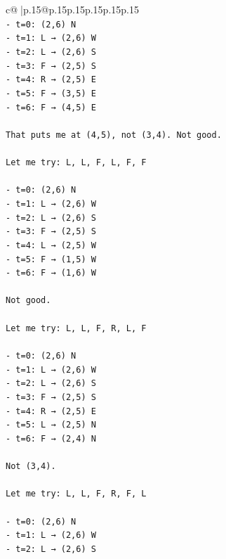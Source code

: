 \documentclass{article}
\begin{document}
{\begin{supertabular}{c@{$\;$}|p{.15\linewidth}@{}p{.15\linewidth}p{.15\linewidth}p{.15\linewidth}p{.15\linewidth}p{.15\linewidth}}
{{{\\ 
\texttt{{-} t=0: (2,6) N} \\
\texttt{{-} t=1: L → (2,6) W} \\
\texttt{{-} t=2: L → (2,6) S} \\
\texttt{{-} t=3: F → (2,5) S} \\
\texttt{{-} t=4: R → (2,5) E} \\
\texttt{{-} t=5: F → (3,5) E} \\
\texttt{{-} t=6: F → (4,5) E} \\
\\ 
\texttt{That puts me at (4,5), not (3,4). Not good.} \\
\\ 
\texttt{Let me try: L, L, F, L, F, F} \\
\\ 
\texttt{{-} t=0: (2,6) N} \\
\texttt{{-} t=1: L → (2,6) W} \\
\texttt{{-} t=2: L → (2,6) S} \\
\texttt{{-} t=3: F → (2,5) S} \\
\texttt{{-} t=4: L → (2,5) W} \\
\texttt{{-} t=5: F → (1,5) W} \\
\texttt{{-} t=6: F → (1,6) W} \\
\\ 
\texttt{Not good.} \\
\\ 
\texttt{Let me try: L, L, F, R, L, F} \\
\\ 
\texttt{{-} t=0: (2,6) N} \\
\texttt{{-} t=1: L → (2,6) W} \\
\texttt{{-} t=2: L → (2,6) S} \\
\texttt{{-} t=3: F → (2,5) S} \\
\texttt{{-} t=4: R → (2,5) E} \\
\texttt{{-} t=5: L → (2,5) N} \\
\texttt{{-} t=6: F → (2,4) N} \\
\\ 
\texttt{Not (3,4).} \\
\\ 
\texttt{Let me try: L, L, F, R, F, L} \\
\\ 
\texttt{{-} t=0: (2,6) N} \\
\texttt{{-} t=1: L → (2,6) W} \\
\texttt{{-} t=2: L → (2,6) S} \\
}}}
\end{supertabular}}
\end{document}
